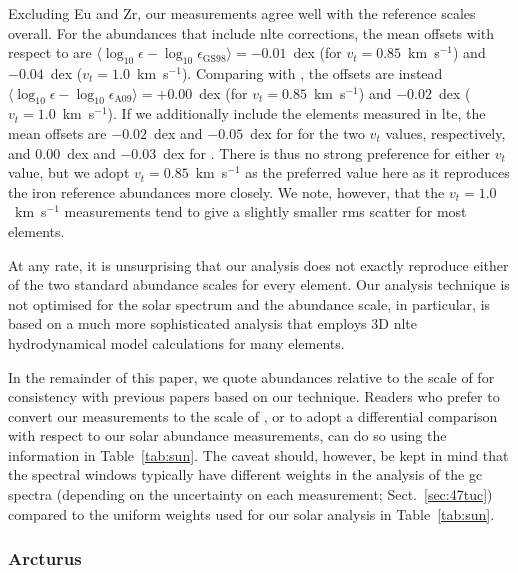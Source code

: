 \documentclass{aa}
\begin{document}
Excluding Eu and Zr, our measurements agree well with the reference scales overall. For the abundances that include \ac{nlte} corrections, the mean offsets with respect to  are $\langle \log_{10} \epsilon - \log_{10} \epsilon_\mathrm{GS98} \rangle = -0.01$~dex (for $v_t=0.85$~km~s$^{-1}$) and $-0.04$~dex ($v_t=1.0$~km~s$^{-1}$). Comparing with , the offsets are instead
$\langle \log_{10} \epsilon - \log_{10} \epsilon_\mathrm{A09} \rangle = +0.00$~dex (for $v_t=0.85$~km~s$^{-1}$) and $-0.02$~dex ($v_t=1.0$~km~s$^{-1}$). 
If we additionally include the elements measured in \ac{lte}, the mean offsets are $-0.02$~dex and $-0.05$~dex for  for the two $v_t$ values, respectively, and
$0.00$~dex and $-0.03$~dex for . There is thus no strong preference for either $v_t$ value, but we adopt $v_t=0.85$~km~s$^{-1}$ as the preferred value here as it reproduces the iron reference abundances more closely. We note, however, that the $v_t=1.0$~km~s$^{-1}$ measurements tend to give a slightly smaller rms scatter for most elements. 

At any rate, it is unsurprising that our analysis does not exactly reproduce either of the two standard abundance scales for every element. Our analysis technique is not optimised for the solar spectrum and the  abundance scale, in particular, is based on a much more sophisticated analysis that employs 3D \ac{nlte} hydrodynamical model calculations for many elements. 

In the remainder of this paper, we quote abundances relative to the scale of  for consistency with previous papers based on our technique. Readers who prefer to convert our measurements to the scale of , or to adopt a differential comparison with respect to our solar abundance measurements, can do so using the information in Table~\ref{tab:sun}. The caveat should, however, be kept in mind that the spectral windows typically have different weights in the analysis of the \ac{gc} spectra (depending on the uncertainty on each measurement; Sect.~\ref{sec:47tuc}) compared to the uniform weights used for our solar analysis in Table~\ref{tab:sun}. 

\subsubsection{Arcturus}
\label{sec:arcturus}
\end{document}
